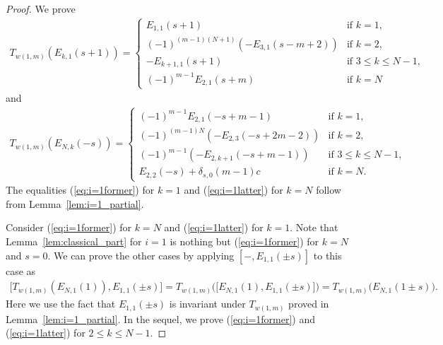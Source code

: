 \documentclass[10pt,a4paper]{amsart}
\theoremstyle{definition}
\numberwithin{equation}{section}
\begin{document}
\begin{proof}We prove
\begin{gather}
T_{w(1,m)}(E_{k,1}(s+1)) = \begin{cases}
E_{1,1}(s+1) & \text{if $k=1$},\\
(-1)^{(m-1)(N+1)} (-E_{3,1}(s-m+2)) & \text{if $k=2$},\\
-E_{k+1,1}(s+1) & \text{if $3 \leq k \leq N-1$},\\
(-1)^{m-1} E_{2,1}(s+m) & \text{if $k=N$}
\end{cases}\label{eq:i=1former}
\end{gather}
and
\begin{gather}
T_{w(1,m)}(E_{N,k}(-s)) = \begin{cases}
(-1)^{m-1} E_{2,1}(-s+m-1) & \text{if $k=1$},\\
(-1)^{(m-1)N} (- E_{2,3}(-s+2m-2)) & \text{if $k=2$},\\
(-1)^{m-1}(- E_{2,k+1}(-s+m-1)) & \text{if $3 \leq k \leq N-1$},\\
E_{2,2}(-s) + \delta_{s,0}(m-1)c & \text{if $k=N$}.
\end{cases}\label{eq:i=1latter}
\end{gather}
The equalities (\ref{eq:i=1former}) for $k=1$ and (\ref{eq:i=1latter}) for $k=N$ follow from Lemma~\ref{lem:i=1_partial}.

Consider (\ref{eq:i=1former}) for $k=N$ and (\ref{eq:i=1latter}) for $k=1$. Note that Lemma~\ref{lem:classical_part} for $i=1$ is nothing but (\ref{eq:i=1former}) for $k=N$ and $s=0$. We can prove the other cases by applying $[-, E_{1,1}(\pm s)]$ to this case as
\begin{gather*}
\big[T_{w(1,m)}(E_{N,1}(1)), E_{1,1}(\pm s)\big] = T_{w(1,m)}\big(\big[E_{N,1}(1), E_{1,1}(\pm s)\big]\big) = T_{w(1,m)}\big(E_{N,1}(1 \pm s)\big).
\end{gather*}
Here we use the fact that $E_{1,1}(\pm s)$ is invariant under $T_{w(1,m)}$ proved in Lemma~\ref{lem:i=1_partial}. In the sequel, we prove (\ref{eq:i=1former}) and (\ref{eq:i=1latter}) for $2 \leq k \leq N-1$.


\end{proof}
\end{document}
